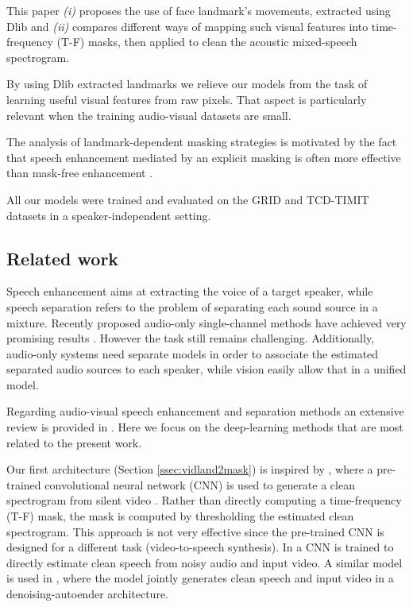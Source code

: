 \documentclass{article}
\begin{document}
This paper \textit{(i)} proposes the use of face landmark's movements, extracted using Dlib \cite{Kazemi_2014_CVPR, dlib09} and \textit{(ii)} compares different ways of mapping such visual features into time-frequency (T-F) masks, then applied to clean the acoustic mixed-speech spectrogram.

By using Dlib extracted landmarks we relieve our models from the task of learning useful visual features from raw pixels. That aspect is particularly relevant when the training audio-visual datasets are small.

The analysis of landmark-dependent masking strategies is motivated by the fact that speech enhancement mediated by an explicit masking is often more effective than mask-free enhancement \cite{yuxuan_wang_training_2014}.

All our models were trained and evaluated on the GRID \cite{cooke_audio-visual_2006} and TCD-TIMIT \cite{harte_tcd-timit:_2015} datasets in a speaker-independent setting.

\subsection{Related work}
Speech enhancement aims at extracting the voice of a target speaker, while speech separation refers to the problem of separating each sound source in a mixture. Recently proposed audio-only single-channel methods have achieved very promising results \cite{DANet17, Isik2016SingleChannelMS, Kolbaek17}.
However the task still remains challenging. Additionally, audio-only systems need separate models in order to associate the estimated separated audio sources to each speaker, while vision easily allow that in a unified model.

Regarding audio-visual speech enhancement and separation methods an extensive review is provided in \cite{rivet:hal-00990000}. Here we focus on the deep-learning methods that are most related to the present work.

Our first architecture (Section \ref{ssec:vidland2mask}) is inspired by \cite{gabbay_seeing_2017}, where a pre-trained convolutional neural network (CNN) is used to
generate a clean spectrogram from silent video \cite{ephrat2017improved}. Rather than directly computing  a time-frequency (T-F) mask, the mask is computed by thresholding the estimated clean spectrogram. This approach is not very effective since the pre-trained CNN is designed for a different task (video-to-speech synthesis).
In \cite{gabbay2018visual} a CNN is trained to directly estimate clean speech from noisy audio and input video. A similar model is used in \cite{hou_audio-visual_2018}, where the model jointly generates clean speech and input video in a denoising-autoender architecture. 
\end{document}
